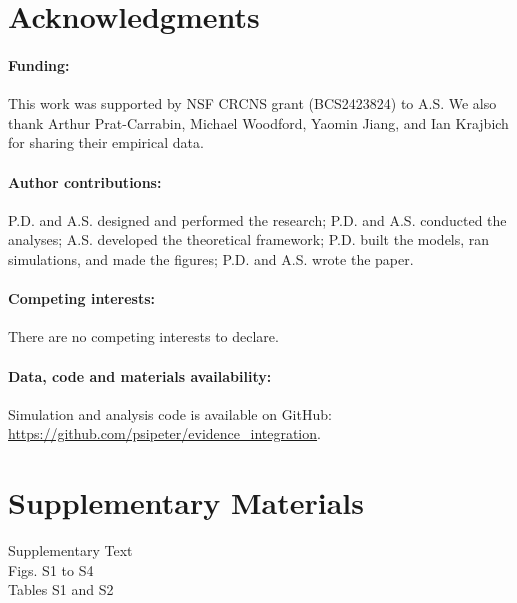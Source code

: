 \documentclass[12pt]{article}
\begin{document}

\clearpage






\section*{Acknowledgments}
\paragraph*{Funding:}
This work was supported by NSF CRCNS grant (BCS2423824) to A.S. We also thank Arthur Prat-Carrabin, Michael Woodford, Yaomin Jiang, and Ian Krajbich for sharing their empirical data.
\paragraph*{Author contributions:}
P.D. and A.S. designed and performed the research; P.D. and A.S. conducted the analyses; A.S. developed the theoretical framework; P.D. built the models, ran simulations, and made the figures; P.D. and A.S. wrote the paper.
\paragraph*{Competing interests:}
There are no competing interests to declare.
\paragraph*{Data, code and materials availability:}
Simulation and analysis code is available on GitHub: \url{https://github.com/psipeter/evidence_integration}.


\section*{Supplementary Materials}
Supplementary Text\\
Figs. S1 to S4\\
Tables S1 and S2
\end{document}
